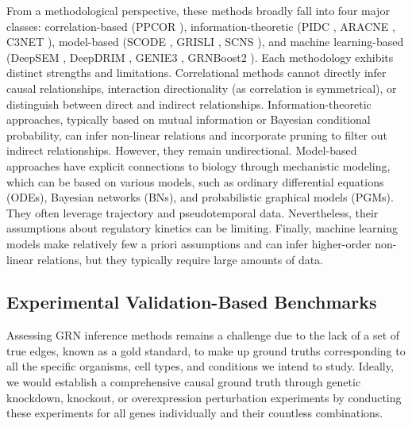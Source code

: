 From a methodological perspective, these methods broadly fall into four major classes: correlation-based (PPCOR \cite{kim2015ppcor}), information-theoretic (PIDC \cite{chan2017gene}, ARACNE \cite{margolin2006aracne}, C3NET \cite{altay2010inferring}), model-based (SCODE \cite{matsumoto2017scode}, GRISLI \cite{aubin2020gene}, SCNS \cite{woodhouse2018scns}), and machine learning-based (DeepSEM \cite{shu2021modeling}, DeepDRIM \cite{chen2021deepdrim}, GENIE3 \cite{huynh2010inferring}, GRNBoost2 \cite{moerman2019grnboost2}). Each methodology exhibits distinct strengths and limitations. Correlational methods cannot directly infer causal relationships, interaction directionality (as correlation is symmetrical), or distinguish between direct and indirect relationships. Information-theoretic approaches, typically based on mutual information or Bayesian conditional probability, can infer non-linear relations and incorporate pruning to filter out indirect relationships. However, they remain undirectional. Model-based approaches have explicit connections to biology through mechanistic modeling, which can be based on various models, such as ordinary differential equations (ODEs),  Bayesian networks (BNs), and probabilistic graphical models (PGMs). They often leverage trajectory and pseudotemporal data. Nevertheless, their assumptions about regulatory kinetics can be limiting. Finally, machine learning models make relatively few a priori assumptions and can infer higher-order non-linear relations, but they typically require large amounts of data. 

\subsection*{Experimental Validation-Based Benchmarks}
Assessing GRN inference methods remains a challenge due to the lack of a set of true edges, known as a gold standard, to make up ground truths corresponding to all the specific organisms, cell types, and conditions we intend to study. Ideally, we would establish a comprehensive causal ground truth through genetic knockdown, knockout, or overexpression perturbation experiments by conducting these experiments for all genes individually and their countless combinations. 

